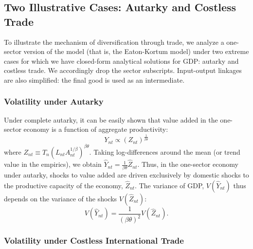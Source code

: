 \documentclass[12pt]{article}
\begin{document}
\subsection{Two Illustrative Cases: Autarky and Costless Trade}

To illustrate the mechanism of diversification through trade, we analyze a
one-sector version of the model (that is, the Eaton-Kortum model) under two
extreme cases for which we have closed-form analytical solutions for GDP:
autarky and costless trade. We accordingly drop the sector subscripts.
Input-output linkages are also simplified: the final good is used as an
intermediate.

\subsubsection{Volatility under Autarky}

Under complete autarky, it can be easily shown that value added in the
one-sector economy is a function of aggregate productivity: 
\begin{equation*}
Y_{nt}\propto \left( Z_{nt}\right) ^{\frac{1}{\beta \theta }}
\end{equation*}%
where $Z_{nt}\equiv T_{n}\left( L_{nt}A_{nt}^{1/\beta }\right) ^{\beta
\theta }$. Taking log-differences around the mean (or trend value in the
empirics), we obtain $\hat{Y}_{nt}=\frac{1}{\beta \theta }\hat{Z}_{nt}.$
Thus, in the one-sector economy under autarky, shocks to value added are
driven exclusively by domestic shocks to the productive capacity of the
economy, $\hat{Z}_{nt}.$ The variance of GDP, $V(\hat{Y}_{nt})$ thus depends
on the variance of the shocks $V(\hat{Z}_{nt})$: 
\begin{equation*}
V(\hat{Y}_{nt})=\frac{1}{\left( \beta \theta \right) ^{2}}V(\hat{Z}_{nt}).
\end{equation*}

\subsubsection{Volatility under Costless International Trade}
\end{document}
